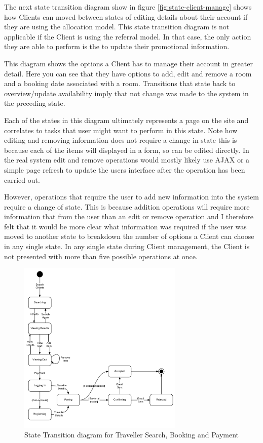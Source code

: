 \documentclass{article}
\begin{document}
The next state transition diagram show in figure \ref{fig:state-client-manage} shows how Clients can moved between states of editing details about their account if they are using the allocation model. This state transition diagram is not applicable if the Client is using the referral model. In that case, the only action they are able to perform is the to update their promotional information.

This diagram shows the options a Client has to manage their account in greater detail. Here you can see that they have options to add, edit and remove a room and a booking date associated with a room. Transitions that state back to overview/update availability imply that not change was made to the system in the preceding state.

Each of the states in this diagram ultimately represents a page on the site and correlates to tasks that user might want to perform in this state. Note how editing and removing information does not require a change in state this is because each of the items will displayed in a form, so can be edited directly. In the real system edit and remove operations would mostly likely use AJAX or a simple page refresh to update the users interface after the operation has been carried out.

However, operations that require the user to add new information into the system require a change of state. This is because addition operations will require more information that from the user than an edit or remove operation and I therefore felt that it would be more clear what information was required if the user was moved to another state to breakdown the number of options a Client can choose in any single state. In any single state during Client management, the Client is not presented with more than five possible operations at once.

\begin{figure}[H]
\centering
\includegraphics[width=0.7\textwidth]{img/state_diagrams/StateTransitionDiagramUserPayement.png}
\caption{State Transition diagram for Traveller Search, Booking and Payment}
\label{fig:state-traveller-book}
\end{figure}
\end{document}
